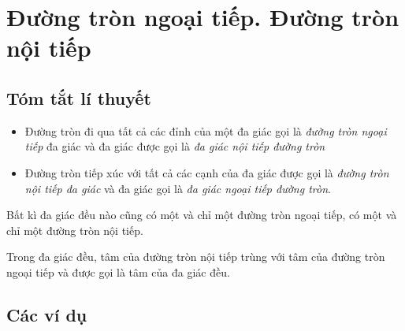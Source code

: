 \section{Đường tròn ngoại tiếp. Đường tròn nội tiếp}
\subsection{Tóm tắt lí thuyết}
\begin{dn}
	\begin{itemize}
		\item Đường tròn đi qua tất cả các đỉnh của một đa giác gọi là \textit{đường tròn ngoại tiếp} đa giác và đa giác được gọi là \textit{đa giác nội tiếp đường tròn}
		\item Đường tròn tiếp xúc với tất cả các cạnh của đa giác được gọi là \textit{đường tròn nội tiếp đa giác} và đa giác gọi là \textit{đa giác ngoại tiếp đường tròn}.
	\end{itemize}
\end{dn}


\begin{dl}
	Bất kì đa giác đều nào cũng có một và chỉ một đường tròn ngoại tiếp, có một và chỉ một đường tròn nội tiếp.
\end{dl}

\begin{note}
	Trong đa giác đều, tâm của đường tròn nội tiếp trùng với tâm của đường tròn ngoại tiếp và được gọi là tâm của đa giác đều.
\end{note}

\subsection{Các ví dụ}



